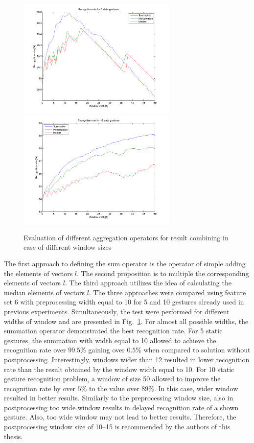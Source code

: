 \begin{figure}[htbp!]
\centering
 \includegraphics[width=0.7\textwidth]{figures/Mul5.png}
\centering 
 \includegraphics[width=0.7\textwidth]{figures/Mul10.png}
 \caption{Evaluation of different aggregation operators for result combining in case of different window sizes}
 \label{staticoper}
\end{figure}

 

The first approach to defining the sum operator is the operator of simple adding the elements of vectors $l$.
The second proposition is to multiple the corresponding elements of vectors $l$. 
The third approach utilizes the idea of calculating the median elements of vectors $l$.
The three approaches were compared using feature set 6 with preprocessing width equal to 10 for 5 and 10 gestures already used in previous experiments.
Simultaneously, the test were performed for different widths of window and are presented in Fig.~\ref{staticoper}.
For almost all possible widths, the summation operator demonstrated the best recognition rate.
For 5 static gestures, the summation with width equal to 10 allowed to achieve the recognition rate over $99.5$\% gaining over $0.5\%$ when compared to solution without postprocessing.
Interestingly, windows wider than 12 resulted in lower recognition rate than the result obtained by the window width equal to 10.
For 10 static gesture recognition problem, a window of size 50 allowed to improve the recognition rate by over $5\%$ to the value over $89$\%.
In this case, wider window resulted in better results. 
Similarly to the preprocessing window size, also in postprocessing too wide window results in delayed recognition rate of a shown gesture.
Also, too wide window may not lead to better results.
Therefore, the postprocessing window size of 10--15 is recommended by the authors of this thesis.


